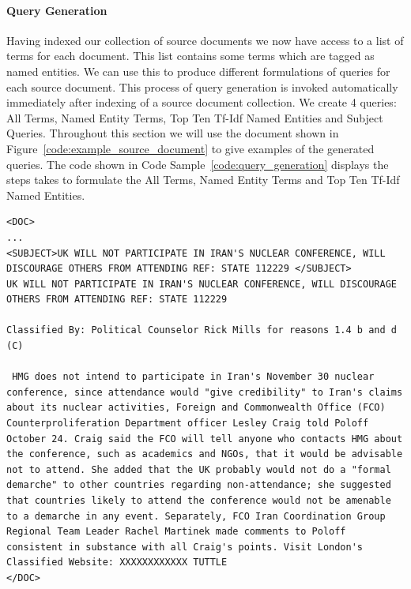 \documentclass{l4proj}
\newenvironment{codelisting}{\captionsetup{type=listing}}{}
\begin{document}
\paragraph{Query Generation} \label{querygen}
Having indexed our collection of source documents we now have access to a list of terms for each document. This list contains some terms which are tagged as named entities. We can use this to produce different formulations of queries for each source document. This process of query generation is invoked automatically immediately after indexing of a source document collection.
We create 4 queries: All Terms, Named Entity Terms, Top Ten Tf-Idf Named Entities and Subject Queries.
Throughout this section we will use the document shown in Figure~\ref{code:example_source_document} to give examples of the generated queries.
The code shown in Code Sample~\ref{code:query_generation} displays the steps takes to formulate the All Terms, Named Entity Terms and Top Ten Tf-Idf Named Entities.
\begin{codelisting}
\begin{verbatim}
<DOC>
...
<SUBJECT>UK WILL NOT PARTICIPATE IN IRAN'S NUCLEAR CONFERENCE, WILL DISCOURAGE OTHERS FROM ATTENDING REF: STATE 112229 </SUBJECT>
UK WILL NOT PARTICIPATE IN IRAN'S NUCLEAR CONFERENCE, WILL DISCOURAGE OTHERS FROM ATTENDING REF: STATE 112229

Classified By: Political Counselor Rick Mills for reasons 1.4 b and d (C)

 HMG does not intend to participate in Iran's November 30 nuclear conference, since attendance would "give credibility" to Iran's claims about its nuclear activities, Foreign and Commonwealth Office (FCO) Counterproliferation Department officer Lesley Craig told Poloff October 24. Craig said the FCO will tell anyone who contacts HMG about the conference, such as academics and NGOs, that it would be advisable not to attend. She added that the UK probably would not do a "formal demarche" to other countries regarding non-attendance; she suggested that countries likely to attend the conference would not be amenable to a demarche in any event. Separately, FCO Iran Coordination Group Regional Team Leader Rachel Martinek made comments to Poloff consistent in substance with all Craig's points. Visit London's Classified Website: XXXXXXXXXXXX TUTTLE
</DOC>
\end{verbatim}
\label{code:example_source_document}
\end{codelisting}
\end{document}
